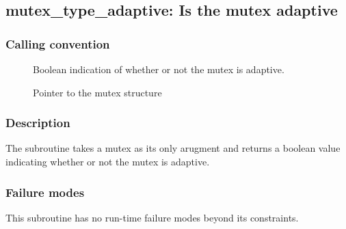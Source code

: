 \clearpage
{}
{}
\label{subr:mutex_type_adaptive}
\subsection*{mutex\_type\_adaptive: Is the mutex adaptive}

\subsubsection*{Calling convention}

\begin{description}
\item[] Boolean indication of whether or not the
  mutex is adaptive.
\item[] Pointer to the mutex structure
\end{description}

\subsubsection*{Description}

The  subroutine takes a mutex as its
only arugment and returns a boolean value indicating whether or not
the mutex is adaptive.

\subsubsection*{Failure modes}

This subroutine has no run-time failure modes beyond its constraints.

